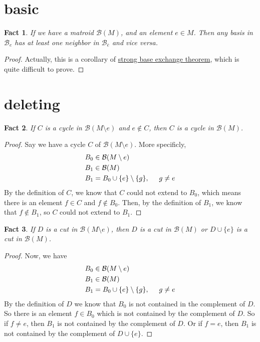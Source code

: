 \documentclass{article}
\newtheorem{fact}{Fact}
\begin{document}
\section{basic}
\begin{fact}
  If we have a matroid $\mathcal{B}(M)$, and an element $e\in M$.
  Then any basis in $\mathcal{B}_e$ has at least one neighbor in $\mathcal{B}_{\overline{e}}$ and vice versa.
\end{fact}
\begin{proof}
  Actually, this is a corollary of \underline{strong base exchange theorem}, which is quite difficult to prove.
\end{proof}

\section{deleting}
\begin{fact}
  If $C$ is a cycle in $\mathcal{B}(M\setminus e)$ and $e\not\in C$,
  then $C$ is a cycle in $\mathcal{B}(M)$.
\end{fact}
\begin{proof}
  Say we have a cycle $C$ of $\mathcal{B}(M\setminus e)$.
  More specificly,
  \begin{align*}
    B_0 &\in \mathcal{B}(M\setminus e) \\
    B_1 &\in \mathcal{B}(M) \\
    B_1 &= B_0 \cup \{e\} \setminus \{g\}, \hspace{0.5cm} g\not= e
  \end{align*}
  By the definition of $C$, we know that $C$ could not extend to $B_0$,
  which means there is an element $f\in C$ and $f\not\in B_0$.
  Then, by the definition of $B_1$, we know that $f\not\in B_1$, so $C$ could not extend to $B_1$.
\end{proof}

\begin{fact}
  If $D$ is a cut in $\mathcal{B}(M\setminus e)$,
  then $D$ is a cut in $\mathcal{B}(M)$ or $D\cup \{e\}$ is a cut in $\mathcal{B}(M)$.
\end{fact}
\begin{proof}
  Now, we have
  \begin{align*}
    B_0 &\in \mathcal{B}(M\setminus e) \\
    B_1 &\in \mathcal{B}(M) \\
    B_1 &= B_0 \cup \{e\} \setminus \{g\}, \hspace{0.5cm} g\not= e
  \end{align*}
  By the definition of $D$ we know that $B_0$ is not contained in the complement of $D$.
  So there is an element $f\in B_0$ which is not contained by the complement of $D$.
  So if $f\not= e$, then $B_1$ is not contained by the complement of $D$.
  Or if $f=e$, then $B_1$ is not contained by the complement of $D\cup \{e\}$.
\end{proof}
\end{document}
